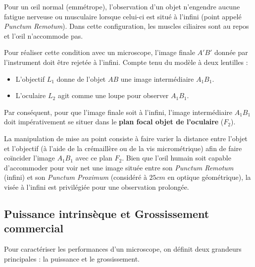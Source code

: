 Pour un œil normal (emmétrope), l'observation d'un objet n'engendre aucune fatigue nerveuse ou musculaire lorsque celui-ci est situé à l'infini (point appelé \textit{Punctum Remotum}). Dans cette configuration, les muscles ciliaires sont au repos et l'œil n'accommode pas.

Pour réaliser cette condition avec un microscope, l'image finale $A'B'$ donnée par l'instrument doit être rejetée à l'infini. Compte tenu du modèle à deux lentilles :
\begin{itemize}
    \item L'objectif $L_1$ donne de l'objet $AB$ une image intermédiaire $A_1B_1$.
    \item L'oculaire $L_2$ agit comme une loupe pour observer $A_1B_1$.
\end{itemize}

Par conséquent, pour que l'image finale soit à l'infini, l'image intermédiaire $A_1B_1$ doit impérativement se situer dans le \textbf{plan focal objet de l'oculaire} ($F_2$).

La manipulation de mise au point consiste à faire varier la distance entre l'objet et l'objectif 
(à l'aide de la crémaillère ou de la vis micrométrique) 
afin de faire coïncider l'image $A_1B_1$ avec ce plan $F_2$. 
Bien que l'œil humain soit capable d'accommoder pour voir net une image située entre son 
\textit{Punctum Remotum} (infini) et son 
\textit{Punctum Proximum} (considéré à $25 cm$ en optique géométrique), 
la visée à l'infini est privilégiée pour une observation prolongée.

\subsection{Puissance intrinsèque et Grossissement commercial}

Pour caractériser les performances d'un microscope, on définit deux grandeurs principales : la puissance et le grossissement.

